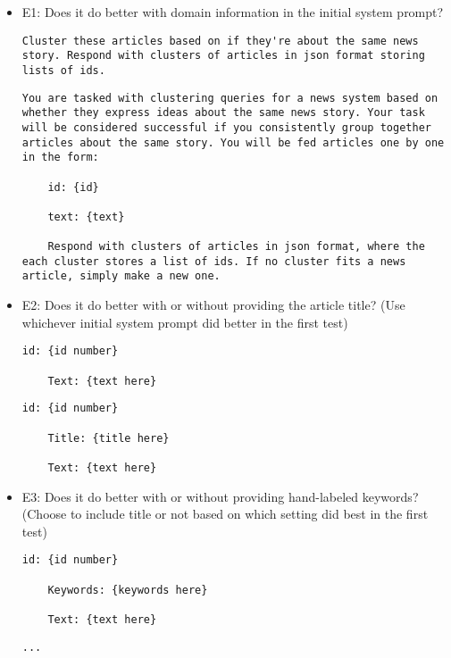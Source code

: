 \begin{itemize}
    \item E1: Does it do better with domain information in the initial system prompt?
    \begin{lstlisting}[title=Prompt 1: Generic Initial System Prompt]
    Cluster these articles based on if they're about the same news story. Respond with clusters of articles in json format storing lists of ids.
    \end{lstlisting}
    
    \begin{lstlisting}[title=Prompt 2: Detailed Initial System Prompt]
    You are tasked with clustering queries for a news system based on whether they express ideas about the same news story. Your task will be considered successful if you consistently group together articles about the same story. You will be fed articles one by one in the form:

    id: {id}
    
    text: {text}
    
    Respond with clusters of articles in json format, where the each cluster stores a list of ids. If no cluster fits a news article, simply make a new one.
    \end{lstlisting}

    
    \item E2: Does it do better with or without providing the article title? (Use whichever initial system prompt did better in the first test)
    \begin{lstlisting}[title=Prompt 3: Text Alone Prompt]
    id: {id number}
    
    Text: {text here}
    \end{lstlisting}
    \begin{lstlisting}[title=Prompt 4: Title and Text Prompt]
    id: {id number}
    
    Title: {title here}

    Text: {text here}
    \end{lstlisting}
    
    \item E3: Does it do better with or without providing hand-labeled keywords? (Choose to include title or not based on which setting did best in the first test)
    \begin{lstlisting}[title=Prompt 5: Keywords Prompt]
    id: {id number}
    
    Keywords: {keywords here}

    Text: {text here}
    \end{lstlisting}
    \begin{lstlisting}[title=Prompt 6: No Keywords Prompt]
    ...
    \end{lstlisting}
\end{itemize}


